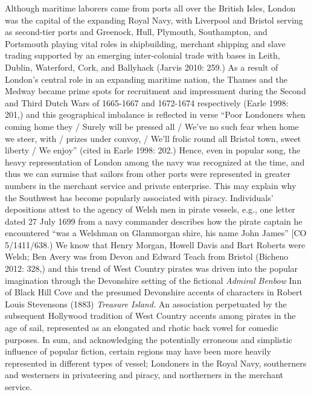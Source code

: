 \begin{styleStandard}
\end{styleStandard}


\begin{styleStandard}
\end{styleStandard}


\begin{styleStandard}
Although maritime laborers came from ports all over the British Isles, London was the capital of the expanding Royal Navy, with Liverpool and Bristol serving as second-tier ports and Greenock, Hull, Plymouth, Southampton, and Portsmouth playing vital roles in shipbuilding, merchant shipping and slave trading supported by an emerging inter-colonial trade with bases in Leith, Dublin, Waterford, Cork, and Ballyhack (Jarvis 2010: 259.) As a result of London’s central role in an expanding maritime nation, the Thames and the Medway became prime spots for recruitment and impressment during the Second and Third Dutch Wars of 1665-1667 and 1672-1674 respectively (Earle 1998: 201,) and this geographical imbalance is reflected in verse “Poor Londoners when coming home they / Surely will be pressed all / We’ve no such fear when home we steer, with / prizes under convoy, / We’ll frolic round all Bristol town, sweet liberty / We enjoy” (cited in Earle 1998: 202.) Hence, even in popular song, the heavy representation of London among the navy was recognized at the time, and thus we can surmise that sailors from other ports were represented in greater numbers in the merchant service and private enterprise. This may explain why the Southwest has become popularly associated with piracy. Individuals’ depositions attest to the agency of Welsh men in pirate vessels, e.g., one letter dated 27 July 1699 from a navy commander describes how the pirate captain he encountered “was a Welshman on Glammorgan shire, his name John James” [CO 5/1411/638.) We know that Henry Morgan, Howell Davis and Bart Roberts were Welsh; Ben Avery was from Devon and Edward Teach from Bristol (Bicheno 2012: 328,) and this trend of West Country pirates was driven into the popular imagination through the Devonshire setting of the fictional \textit{Admiral Benbow} Inn of Black Hill Cove and the presumed Devonshire accents of characters in Robert Louis Stevenson{\textquotesingle}s (1883) \textit{Treasure Island. }An association perpetuated by the subsequent Hollywood tradition of West Country accents among pirates in the age of sail, represented as an elongated and rhotic back vowel for comedic purposes. In sum, and acknowledging the potentially erroneous and simplistic influence of popular fiction, certain regions may have been more heavily represented in different types of vessel; Londoners in the Royal Navy, southerners and westerners in privateering and piracy, and northerners in the merchant service. 
\end{styleStandard}


